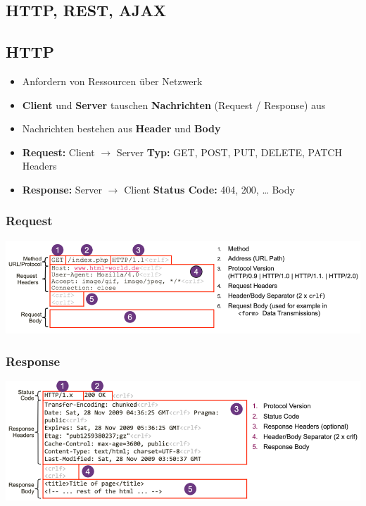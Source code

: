 \documentclass[a4paper, landscape, 8pt]{scrartcl}
\begin{document}
\begin{multicols*}{4}
        \section{HTTP, REST, AJAX}

        \subsection{HTTP}
        \begin{itemize}
            \item Anfordern von Ressourcen über Netzwerk
            \item \textbf{Client} und \textbf{Server} tauschen \textbf{Nachrichten} (Request / Response) aus
            \item Nachrichten bestehen aus \textbf{Header} und \textbf{Body}
            \item \textbf{Request:} Client $\to$ Server
            \subitem \textbf{Typ:} GET, POST, PUT, DELETE, PATCH
            \subitem Headers
            \item \textbf{Response:} Server $\to$ Client
            \subitem \textbf{Status Code:} 404, 200, \ldots
            \subitem Body
        \end{itemize}

        \subsubsection{Request}
        \includegraphics[width=\columnwidth]{graphic/36-http-request}

        \subsubsection{Response}
        \includegraphics[width=\columnwidth]{graphic/37-http-response}


\end{multicols*}
\end{document}
